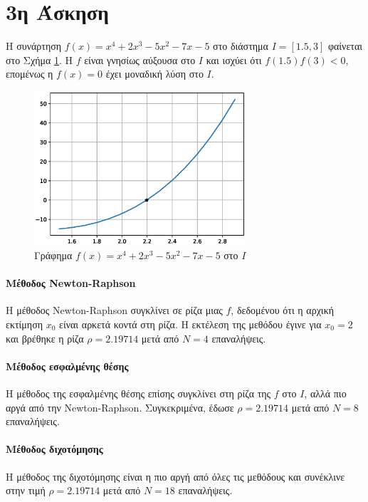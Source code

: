 \documentclass[assignment2.tex]{subfiles}
\begin{document}
\section*{3η Άσκηση}
Η συνάρτηση $f(x)=x^4+2x^3-5x^2-7x-5$ στο διάστημα $I=[1.5, 3]$ φαίνεται στο Σχήμα \ref{fig:f3}. Η $f$ είναι γνησίως αύξουσα στο $I$ και ισχύει ότι $f(1.5)f(3)<0$, επομένως η $f(x)=0$ έχει μοναδική λύση στο $I$.
\begin{figure}[hp]
	\includegraphics[width=0.7\textwidth]{f3.eps}
	\centering
	\caption{Γράφημα $f(x)=x^4+2x^3-5x^2-7x-5$ στο $I$}
	\label{fig:f3}
\end{figure}

\paragraph{Μέθοδος \textlatin{Newton-Raphson}}
Η μέθοδος \textlatin{Newton-Raphson} συγκλίνει σε ρίζα μιας $f$, δεδομένου ότι η αρχική εκτίμηση $x_0$ είναι αρκετά κοντά στη ρίζα. Η εκτέλεση της μεθόδου έγινε για $x_0=2$ και βρέθηκε η ρίζα $\rho= 2.19714$ μετά από $N=4$ επαναλήψεις.

\paragraph{Μέθοδος εσφαλμένης θέσης}
Η μέθοδος της εσφαλμένης θέσης επίσης συγκλίνει στη ρίζα της $f$ στο $I$, αλλά πιο αργά από την \textlatin{Newton-Raphson}. Συγκεκριμένα, έδωσε $\rho=2.19714$ μετά από $N=8$ επαναλήψεις.

\paragraph{Μέθοδος διχοτόμησης}
Η μέθοδος της διχοτόμησης είναι η πιο αργή από όλες τις μεθόδους και συνέκλινε στην τιμή $\rho=2.19714$ μετά από $N=18$ επαναλήψεις.
\end{document}
